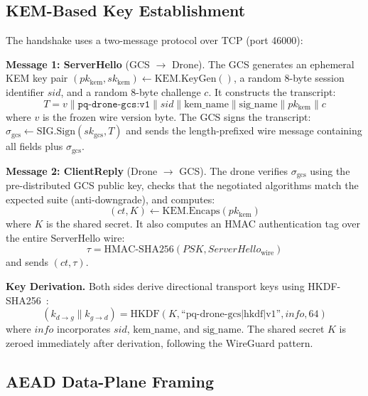 \documentclass[conference]{IEEEtran}
\begin{document}
\subsection{KEM-Based Key Establishment}

The handshake uses a two-message protocol over TCP (port 46000):

\textbf{Message 1: ServerHello} (GCS $\to$ Drone).
The GCS generates an ephemeral KEM key pair $(pk_{\mathrm{kem}}, sk_{\mathrm{kem}}) \gets \mathrm{KEM.KeyGen}()$, a random 8-byte session identifier $\mathit{sid}$, and a random 8-byte challenge $c$.
It constructs the transcript:
\begin{equation}
\label{eq:transcript}
    T = v \mathbin\| \texttt{pq-drone-gcs:v1} \mathbin\| \mathit{sid} \mathbin\| \mathrm{kem\_name} \mathbin\| \mathrm{sig\_name} \mathbin\| pk_{\mathrm{kem}} \mathbin\| c
\end{equation}
where $v$ is the frozen wire version byte.
The GCS signs the transcript:
$\sigma_{\mathrm{gcs}} \gets \mathrm{SIG.Sign}(sk_{\mathrm{gcs}}, T)$
and sends the length-prefixed wire message containing all fields plus $\sigma_{\mathrm{gcs}}$.

\textbf{Message 2: ClientReply} (Drone $\to$ GCS).
The drone verifies $\sigma_{\mathrm{gcs}}$ using the pre-distributed GCS public key, checks that the negotiated algorithms match the expected suite (anti-downgrade), and computes:
\begin{equation}
    (\mathit{ct}, K) \gets \mathrm{KEM.Encaps}(pk_{\mathrm{kem}})
\end{equation}
where $K$ is the shared secret.
It also computes an HMAC authentication tag over the entire ServerHello wire:
\begin{equation}
    \tau = \mathrm{HMAC\text{-}SHA256}(\mathit{PSK}, \mathit{ServerHello}_{\mathrm{wire}})
\end{equation}
and sends $(ct, \tau)$.

\textbf{Key Derivation.}
Both sides derive directional transport keys using HKDF-SHA256~\cite{rfc5869}:
\begin{equation}
\label{eq:hkdf}
    (k_{d \to g} \mathbin\| k_{g \to d}) = \mathrm{HKDF}(K, \text{``pq-drone-gcs|hkdf|v1''}, \mathit{info}, 64)
\end{equation}
where $\mathit{info}$ incorporates $\mathit{sid}$, $\mathrm{kem\_name}$, and $\mathrm{sig\_name}$.
The shared secret $K$ is zeroed immediately after derivation, following the WireGuard pattern.

\subsection{AEAD Data-Plane Framing}
\end{document}
